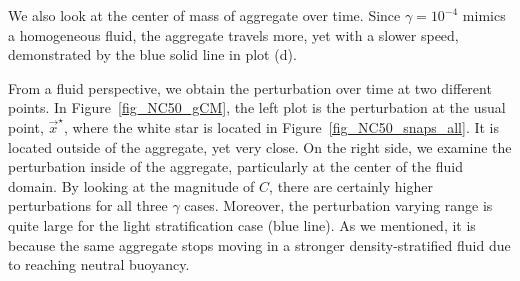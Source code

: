 We also look at the center of mass of aggregate over time. Since $\gamma = 10^{-4}$ mimics a homogeneous fluid, the aggregate travels more, yet with a slower speed, demonstrated by the blue solid line in plot (d).
\par
From a fluid perspective, we obtain the perturbation over time at two different points. In Figure~\ref{fig_NC50_gCM}, the left plot is the perturbation at the usual point, $\vec{x}^{\star}$, where the white star is located in Figure~\ref{fig_NC50_snaps_all}. It is located outside of the aggregate, yet very close. On the right side, we examine the perturbation inside of the aggregate, particularly at the center of the fluid domain. By looking at the magnitude of $C$, there are certainly higher perturbations for all three $\gamma$ cases. Moreover, the perturbation varying range is quite large for the light stratification case (blue line). As we mentioned, it is because the same aggregate stops moving in a stronger density-stratified fluid due to reaching neutral buoyancy.
